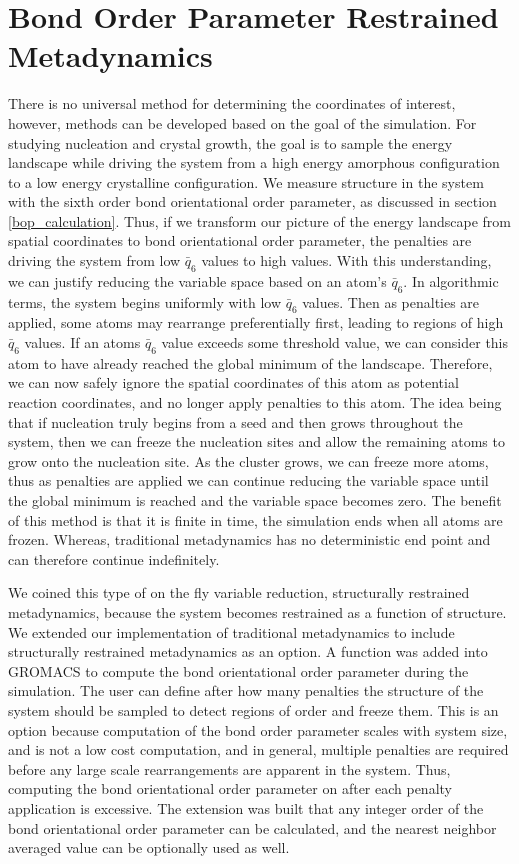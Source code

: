 \section{Bond Order Parameter Restrained Metadynamics}
There is no universal method for determining the coordinates of interest, however, methods can be developed based on the goal of the simulation.  For studying nucleation and crystal growth, the goal is to sample the energy landscape while driving the system from a high energy amorphous configuration to a low energy crystalline configuration.  We measure structure in the system with the sixth order bond orientational order parameter, as discussed in section \ref{bop_calculation}.  Thus, if we transform our picture of the energy landscape from spatial coordinates to bond orientational order parameter, the penalties are driving the system from low $\bar{q}_6$ values to high values.  With this understanding, we can justify reducing the variable space based on an atom's $\bar{q}_6$.  In algorithmic terms, the system begins uniformly with low $\bar{q}_6$ values.  Then as penalties are applied, some atoms may rearrange preferentially first, leading to regions of high $\bar{q}_6$ values.  If an atoms $\bar{q}_6$ value exceeds some threshold value, we can consider this atom to have already reached the global minimum of the landscape.  Therefore, we can now safely ignore the spatial coordinates of this atom as potential reaction coordinates, and no longer apply penalties to this atom.  The idea being that if nucleation truly begins from a seed and then grows throughout the system, then we can freeze the nucleation sites and allow the remaining atoms to grow onto the nucleation site.  As the cluster grows, we can freeze more atoms, thus as penalties are applied we can continue reducing the variable space until the global minimum is reached and the variable space becomes zero.  The benefit of this method is that it is finite in time, the simulation ends when all atoms are frozen.  Whereas, traditional metadynamics has no deterministic end point and can therefore continue indefinitely.  

We coined this type of on the fly variable reduction, structurally restrained metadynamics, because the system becomes restrained as a function of structure.  We extended our implementation of traditional metadynamics to include structurally restrained metadynamics as an option.  A function was added into GROMACS to compute the bond orientational order parameter during the simulation.  The user can define after how many penalties the structure of the system should be sampled to detect regions of order and freeze them.  This is an option because computation of the bond order parameter scales with system size, and is not a low cost computation, and in general, multiple penalties are required before any large scale rearrangements are apparent in the system.  Thus, computing the bond orientational order parameter on after each penalty application is excessive.  The extension was built that any integer order of the bond orientational order parameter can be calculated, and the nearest neighbor averaged value can be optionally used as well.

